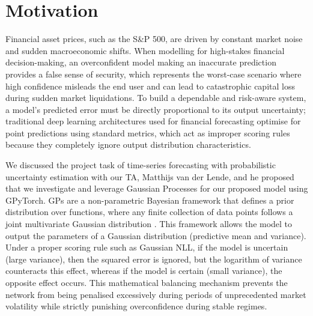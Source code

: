 \documentclass{article}
\begin{document}
\section*{Motivation}

Financial asset prices, such as the S\&P 500, are driven by constant market noise and sudden macroeconomic shifts. When modelling for high-stakes financial decision-making, an overconfident model making an inaccurate prediction provides a false sense of security, which represents the worst-case scenario where high confidence misleads the end user and can lead to catastrophic capital loss during sudden market liquidations. To build a dependable and risk-aware system, a model's predicted error must be directly proportional to its output uncertainty; traditional deep learning architectures used for financial forecasting optimise for point predictions using standard metrics, which act as improper scoring rules because they completely ignore output distribution characteristics.  

We discussed the project task of time-series forecasting with probabilistic uncertainty estimation with our TA, Matthijs van der Lende, and he proposed that we investigate and leverage Gaussian Processes for our proposed model using GPyTorch. GPs are a non-parametric Bayesian framework that defines a prior distribution over functions, where any finite collection of data points follows a joint multivariate Gaussian distribution \cite{10.7551/mitpress/3206.001.0001}. This framework allows the model to output the parameters of a Gaussian distribution (predictive mean and variance). Under a proper scoring rule such as Gaussian NLL, if the model is uncertain (large variance), then the squared error is ignored, but the logarithm of variance counteracts this effect, whereas if the model is certain (small variance), the opposite effect occurs. This mathematical balancing mechanism prevents the network from being penalised excessively during periods of unprecedented market volatility while strictly punishing overconfidence during stable regimes.  
\end{document}
